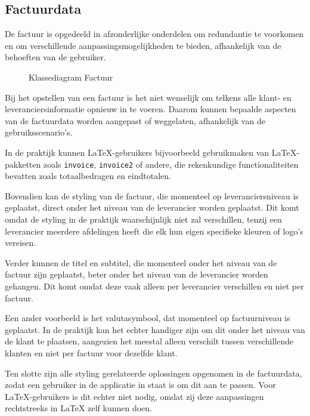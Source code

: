 \subsection{Factuurdata}\label{sub:invoice data}
De factuur is opgedeeld in afzonderlijke onderdelen om redundantie te voorkomen en om verschillende aanpassingsmogelijkheden te bieden, afhankelijk van de behoeften van de gebruiker.
\begin{figure}[!ht]
    \centering
    
    \caption{Klassediagram Factuur}\label{fig:invoice-cd}
\end{figure}
Bij het opstellen van een factuur is het niet wenselijk om telkens alle klant- en leveranciersinformatie opnieuw in te voeren.
Daarom kunnen bepaalde aspecten van de factuurdata worden aangepast of weggelaten, afhankelijk van de gebruiksscenario's.

In de praktijk kunnen LaTeX-gebruikers bijvoorbeeld gebruikmaken van LaTeX-pakketten zoals \texttt{invoice}, \texttt{invoice2} of andere, die rekenkundige functionaliteiten bevatten zoals totaalbedragen en eindtotalen.

Bovendien kan de styling van de factuur, die momenteel op leveranciersniveau is geplaatst, direct onder het niveau van de leverancier worden geplaatst.
Dit komt omdat de styling in de praktijk waarschijnlijk niet zal verschillen, tenzij een leverancier meerdere afdelingen heeft die elk hun eigen specifieke kleuren of logo's vereisen.

Verder kunnen de titel en subtitel, die momenteel onder het niveau van de factuur zijn geplaatst, beter onder het niveau van de leverancier worden gehangen.
Dit komt omdat deze vaak alleen per leverancier verschillen en niet per factuur.

Een ander voorbeeld is het valutasymbool, dat momenteel op factuurniveau is geplaatst.
In de praktijk kan het echter handiger zijn om dit onder het niveau van de klant te plaatsen, aangezien het meestal alleen verschilt tussen verschillende klanten en niet per factuur voor dezelfde klant.

Ten slotte zijn alle styling gerelateerde oplossingen opgenomen in de factuurdata, zodat een gebruiker in de applicatie in staat is om dit aan te passen.
Voor LaTeX-gebruikers is dit echter niet nodig, omdat zij deze aanpassingen rechtstreeks in LaTeX zelf kunnen doen.

